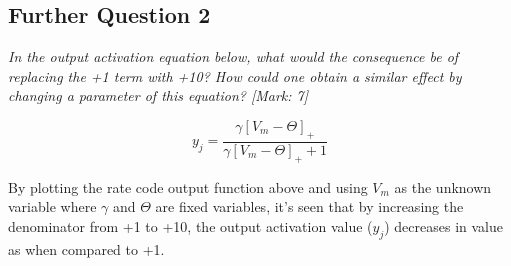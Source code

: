 \subsection{Further Question 2}
\label{Further Question 2 SubSection}

\begin{tcolorbox}[colback=gray!20!white,colframe=gray!20!white]
  \emph{In the output activation equation below, what would the consequence be of replacing the +1 term with +10? How could one obtain a similar effect by changing a parameter of this equation? [Mark: 7]}

\begin{equation}
    y_j = \frac{\gamma[V_m - \Theta]_+}{\gamma[V_m - \Theta]_+ + 1}
\end{equation}
\end{tcolorbox} 
\vspace{0.5cm}

By plotting the rate code output function above and using $V_m$ as the unknown variable where $\gamma$ and $\Theta$ are fixed variables, it's seen that by increasing the denominator from +1 to +10, the output activation value ($y_j$) decreases in value as when compared to +1. 